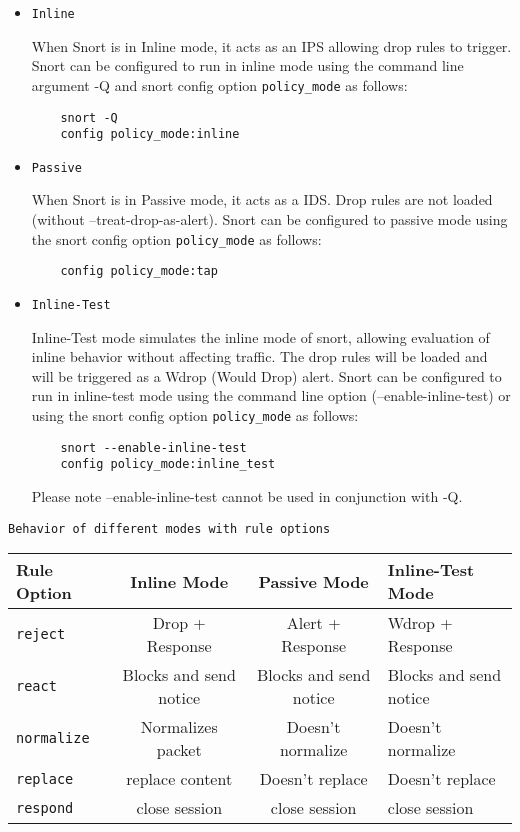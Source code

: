 \documentclass[english]{report}
\newenvironment{note}{
\samepage
    \vspace{10pt}{\textsf{
        {\hspace{7pt}\Huge{$\triangle$\hspace{-12.5pt}{\Large{$^!$}}}}\hspace{5pt}
        {\Large{NOTE}}
    }
    }
   \begin{center}
    \par\vspace{-17pt}

    \begin{lrbox}{\savepar}
    \begin{minipage}[r]{6in}
}
{
    \end{minipage}
    \end{lrbox}
    \fbox{
        \usebox{
            \savepar
	}
    }
    \par\vskip10pt
    \end{center}
}
\newenvironment{note}{
        \begin{rawhtml}
        <p><table border="1"><tr><td><b>
        Note:&nbsp;&nbsp;</b>
        \end{rawhtml}
}{
        \begin{rawhtml}
        </b></td></tr></table></p>
        \end{rawhtml}
}
\begin{document}
\begin{itemize}

\item \texttt{Inline}

When Snort is in Inline mode, it acts as an IPS allowing drop rules to trigger. Snort can be 
configured to run in inline mode using the command line argument -Q and snort config option 
\texttt{policy\_mode} as follows:

\begin{verbatim}
    snort -Q
    config policy_mode:inline
\end{verbatim}

\item \texttt{Passive}

When Snort is in Passive mode, it acts as a IDS. Drop rules are not loaded (without --treat-drop-as-alert). 
Snort can be configured to passive mode using the snort config option \texttt{policy\_mode} as follows:

\begin{verbatim}
    config policy_mode:tap
\end{verbatim}


\item \texttt{Inline-Test}

Inline-Test mode simulates the inline mode of snort, allowing evaluation of inline behavior without affecting 
traffic. The drop rules will be loaded and will be triggered as a Wdrop (Would Drop) alert. Snort can be 
configured to run in inline-test mode using the command line option (--enable-inline-test) or using the 
snort config option \texttt{policy\_mode} as follows:

\begin{verbatim}
    snort --enable-inline-test
    config policy_mode:inline_test
\end{verbatim}

\begin{note}

Please note --enable-inline-test cannot be used in conjunction with -Q.

\end{note}

\end{itemize}

\texttt{Behavior of different modes with rule options}


\begin{tabular}{|l|c|c|p{6cm}|}
\hline
Rule Option & Inline Mode & Passive Mode & Inline-Test Mode\\
\hline
\hline
\texttt{reject} & Drop + Response & Alert + Response & Wdrop + Response\\
\hline
\texttt{react} & Blocks and send notice & Blocks and send notice & Blocks and send notice\\
\hline
\texttt{normalize} & Normalizes packet & Doesn't normalize & Doesn't normalize\\
\hline
\texttt{replace} & replace content & Doesn't replace & Doesn't replace\\
\hline
\texttt{respond} & close session & close session & close session\\
\hline
\end{tabular}
\end{document}
